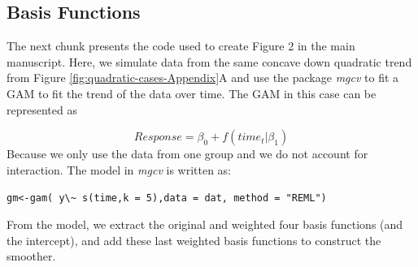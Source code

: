 \documentclass[
]{article}
\newcommand{\passthrough}[1]{#1}
\begin{document}
\hypertarget{basis-functions}{%
\subsection{Basis Functions}\label{basis-functions}}

The next chunk presents the code used to create Figure 2 in the main manuscript. Here, we simulate data from the same concave down quadratic trend from Figure \ref{fig:quadratic-cases-Appendix}A and use the package \emph{mgcv} to fit a GAM to fit the trend of the data over time. The GAM in this case can be represented as

\[Response= \beta_0 + f(time_t|\beta_1)\]
Because we only use the data from one group and we do not account for interaction. The model in \emph{mgcv} is written as:

\passthrough{\lstinline!gm<-gam( y\~ s(time,k = 5),data = dat, method = "REML")!}

From the model, we extract the original and weighted four basis functions (and the intercept), and add these last weighted basis functions to construct the smoother.
\end{document}
